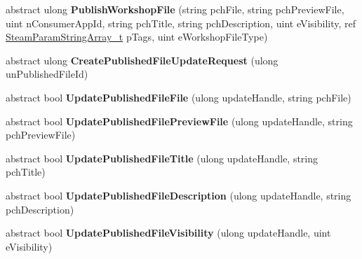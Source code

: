 \begin{DoxyCompactItemize}
\item 
\hypertarget{classValve_1_1Steamworks_1_1ISteamRemoteStorage_a76077f1c5b097c9dfd14475104c08a00}{}abstract ulong {\bfseries Publish\+Workshop\+File} (string pch\+File, string pch\+Preview\+File, uint n\+Consumer\+App\+Id, string pch\+Title, string pch\+Description, uint e\+Visibility, ref \hyperlink{structValve_1_1Steamworks_1_1SteamParamStringArray__t}{Steam\+Param\+String\+Array\+\_\+t} p\+Tags, uint e\+Workshop\+File\+Type)\label{classValve_1_1Steamworks_1_1ISteamRemoteStorage_a76077f1c5b097c9dfd14475104c08a00}

\item 
\hypertarget{classValve_1_1Steamworks_1_1ISteamRemoteStorage_a0d4ef9694c7f06c707c2188c9fa60374}{}abstract ulong {\bfseries Create\+Published\+File\+Update\+Request} (ulong un\+Published\+File\+Id)\label{classValve_1_1Steamworks_1_1ISteamRemoteStorage_a0d4ef9694c7f06c707c2188c9fa60374}

\item 
\hypertarget{classValve_1_1Steamworks_1_1ISteamRemoteStorage_a244bae1d29d85394ccafbbf8dd737170}{}abstract bool {\bfseries Update\+Published\+File\+File} (ulong update\+Handle, string pch\+File)\label{classValve_1_1Steamworks_1_1ISteamRemoteStorage_a244bae1d29d85394ccafbbf8dd737170}

\item 
\hypertarget{classValve_1_1Steamworks_1_1ISteamRemoteStorage_a8e6dc07e62fba8000135189c9d96ca95}{}abstract bool {\bfseries Update\+Published\+File\+Preview\+File} (ulong update\+Handle, string pch\+Preview\+File)\label{classValve_1_1Steamworks_1_1ISteamRemoteStorage_a8e6dc07e62fba8000135189c9d96ca95}

\item 
\hypertarget{classValve_1_1Steamworks_1_1ISteamRemoteStorage_a5639093a1284eb20c2ab9b74c34a4fa1}{}abstract bool {\bfseries Update\+Published\+File\+Title} (ulong update\+Handle, string pch\+Title)\label{classValve_1_1Steamworks_1_1ISteamRemoteStorage_a5639093a1284eb20c2ab9b74c34a4fa1}

\item 
\hypertarget{classValve_1_1Steamworks_1_1ISteamRemoteStorage_a31ba8eba09adc80ca6c89ec34ac285eb}{}abstract bool {\bfseries Update\+Published\+File\+Description} (ulong update\+Handle, string pch\+Description)\label{classValve_1_1Steamworks_1_1ISteamRemoteStorage_a31ba8eba09adc80ca6c89ec34ac285eb}

\item 
\hypertarget{classValve_1_1Steamworks_1_1ISteamRemoteStorage_a3c21560a3cf8ddd057f5e6d42eef4122}{}abstract bool {\bfseries Update\+Published\+File\+Visibility} (ulong update\+Handle, uint e\+Visibility)\label{classValve_1_1Steamworks_1_1ISteamRemoteStorage_a3c21560a3cf8ddd057f5e6d42eef4122}


\end{DoxyCompactItemize}
